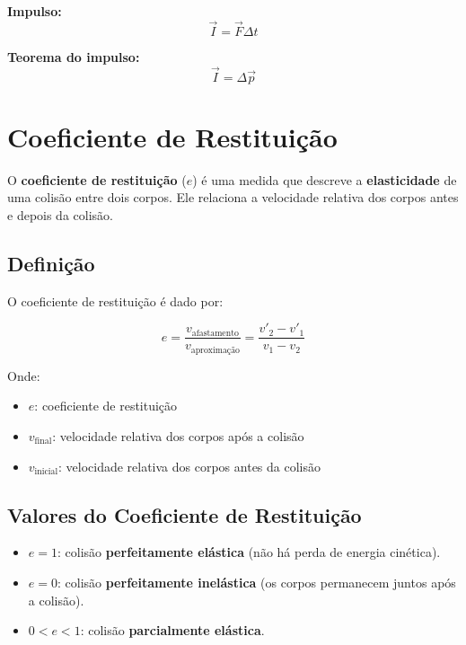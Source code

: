 \documentclass[a4paper,12pt]{article}
\begin{document}
\begin{multicols}{2}
\textbf{Impulso:}
\begin{equation*}
  \vec{I} = \vec{F} \Delta t
\end{equation*}

\textbf{Teorema do impulso:}
\begin{equation*}
  \vec{I} = \Delta \vec{p}
\end{equation*}

\section{Coeficiente de Restituição}

O \textbf{coeficiente de restituição} (\( e \)) é uma medida que descreve a \textbf{elasticidade} de uma colisão entre dois corpos. Ele relaciona a velocidade relativa dos corpos antes e depois da colisão.

\subsection{Definição}

O coeficiente de restituição é dado por:

\[
e = \frac{v_{\text{afastamento}}}{v_{\text{aproximação}}} = \frac{v'_{2} - v'_{1}}{v_{1} - v_{2}}
\]

Onde:
\begin{itemize}
  \item \( e \): coeficiente de restituição
  \item \( v_{\text{final}} \): velocidade relativa dos corpos após a colisão
  \item \( v_{\text{inicial}} \): velocidade relativa dos corpos antes da colisão
\end{itemize}

\subsection{Valores do Coeficiente de Restituição}

\begin{itemize}
  \item \( e = 1 \): colisão \textbf{perfeitamente elástica} (não há perda de energia cinética).
  \item \( e = 0 \): colisão \textbf{perfeitamente inelástica} (os corpos permanecem juntos após a colisão).
  \item \( 0 < e < 1 \): colisão \textbf{parcialmente elástica}.
\end{itemize}


\end{multicols}
\end{document}
